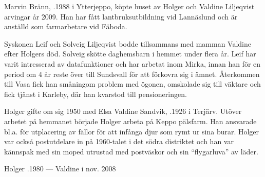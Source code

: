 


Marvin Bränn, .1988 i Ytterjeppo, köpte huset av Holger och Valdine Liljeqvist arvingar år 2009. Han har fått lantbruksutbildning vid Lannäslund och är anställd som farmarbetare vid Fäboda.\jhvspace{}


Syskonen Leif och Solveig Liljeqvist bodde tillsammans med mamman  Valdine efter Holgers död. Solveig skötte daghemsbarn i hemmet under flera år. Leif har varit intresserad av datafunktioner och har arbetat inom Mirka, innan han för en period om 4 år reste över till Sundsvall för att förkovra sig i ämnet. Återkommen till Vasa fick han småningom problem med ögonen, omskolade sig till väktare och fick tjänst i Karleby, där han kvarstod till pensioneringen.


Holger gifte om sig 1950 med Elsa Valdine Sandvik, .1926 i Terjärv. Utöver arbetet på hemmanet började Holger arbeta på Keppo pälsfarm. Han ansvarade bl.a. för utplacering av fällor för att infånga djur som rymt ur sina burar. Holger var också postutdelare in på 1960-talet i det södra distriktet och han var kännspak med sin moped utrustad med postväskor och sin ``flygarluva'' av läder.
\begin{jhchildren}
  \item {}
  \item {}
  \item {}
  \item {}
  \item {}
  \item {}
\end{jhchildren}

Holger .1980  ---  Valdine \textdied i nov. 2008


